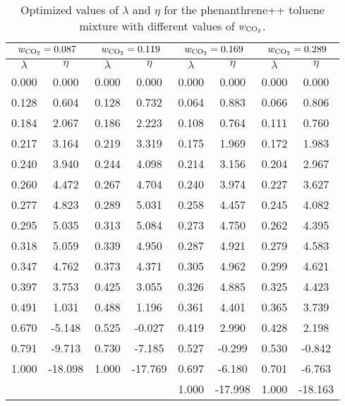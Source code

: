 \documentclass[preprint,12p,times]{elsarticle}
\begin{document}
	\begin{table*}[h]
		\centering
		\caption{Optimized values of $\lambda $ and $\eta $ for the phenanthrene++ toluene mixture with different values of $w_\text{\ce{CO_2}}$.}
		\label{tbl:lambdaco2}
		\begin{tabular}{cccccccc}
			\hline\hline
			\multicolumn{2}{c}{$w_\text{\ce{CO_2}}=0.087$}& \multicolumn{2}{c}{$w_\text{\ce{CO_2}}=0.119$}& \multicolumn{2}{c}{$w_\text{\ce{CO_2}}=0.169$}& \multicolumn{2}{c}{$w_\text{\ce{CO_2}}=0.289$}\\
			\hline\hline
			$\lambda$ & $\eta$ & $\lambda$ & $\eta$  & $\lambda$ & $\eta$  & $\lambda$ & $\eta$ \\ 
			\hline\hline
			0.000    &    0.000    &    0.000    &    0.000    &    0.000    &    0.000    &    0.000    &    0.000    \\
			0.128    &    0.604    &    0.128    &    0.732    &    0.064    &    0.883    &    0.066    &    0.806    \\
			0.184    &    2.067    &    0.186    &    2.223    &    0.108    &    0.764    &    0.111    &    0.760    \\
			0.217    &    3.164    &    0.219    &    3.319    &    0.175    &    1.969    &    0.172    &    1.983    \\
			0.240    &    3.940    &    0.244    &    4.098    &    0.214    &    3.156    &    0.204    &    2.967    \\
			0.260    &    4.472    &    0.267    &    4.704    &    0.240    &    3.974    &    0.227    &    3.627    \\
			0.277    &    4.823    &    0.289    &    5.031    &    0.258    &    4.457    &    0.245    &    4.082    \\
			0.295    &    5.035    &    0.313    &    5.084    &    0.273    &    4.750    &    0.262    &    4.395    \\
			0.318    &    5.059    &    0.339    &    4.950    &    0.287    &    4.921    &    0.279    &    4.583    \\
			0.347    &    4.762    &    0.373    &    4.371    &    0.305    &    4.962    &    0.299    &    4.621    \\
			0.397    &    3.753    &    0.425    &    3.055    &    0.326    &    4.885    &    0.325    &    4.423    \\
			0.491    &    1.031    &    0.488    &    1.196    &    0.361    &    4.401    &    0.365    &    3.739    \\
			0.670    &    -5.148    &    0.525    &    -0.027    &    0.419    &    2.990    &    0.428    &    2.198    \\
			0.791    &    -9.713    &    0.730    &    -7.185    &    0.527    &    -0.299    &    0.530    &    -0.842    \\
			1.000    &    -18.098    &    1.000    &    -17.769    &    0.697    &    -6.180    &    0.701    &    -6.763    \\
			&        &        &        &    1.000    &    -17.998    &    1.000    &    -18.163    \\
			\hline\hline
		\end{tabular}
	\end{table*}
	
\end{document}
